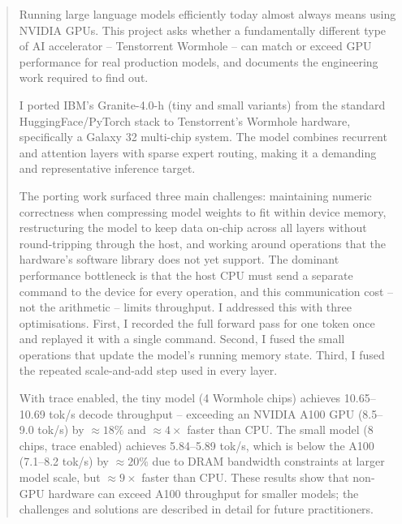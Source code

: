 \begin{abstract}
Running large language models efficiently today almost always means using NVIDIA GPUs. This project asks whether a fundamentally different type of AI accelerator -- Tenstorrent Wormhole -- can match or exceed GPU performance for real production models, and documents the engineering work required to find out.

I ported IBM's Granite-4.0-h (tiny and small variants) from the standard HuggingFace/PyTorch stack to Tenstorrent's Wormhole hardware, specifically a Galaxy 32 multi-chip system. The model combines recurrent and attention layers with sparse expert routing, making it a demanding and representative inference target.

The porting work surfaced three main challenges: maintaining numeric correctness when compressing model weights to fit within device memory, restructuring the model to keep data on-chip across all layers without round-tripping through the host, and working around operations that the hardware's software library does not yet support. The dominant performance bottleneck is that the host CPU must send a separate command to the device for every operation, and this communication cost -- not the arithmetic -- limits throughput. I addressed this with three optimisations. First, I recorded the full forward pass for one token once and replayed it with a single command. Second, I fused the small operations that update the model's running memory state. Third, I fused the repeated scale-and-add step used in every layer.

With trace enabled, the tiny model (4 Wormhole chips) achieves 10.65--10.69 tok/s decode throughput -- exceeding an NVIDIA A100 GPU (8.5--9.0 tok/s) by ${\approx}18\%$ and ${\approx}4\times$ faster than CPU. The small model (8 chips, trace enabled) achieves 5.84--5.89 tok/s, which is below the A100 (7.1--8.2 tok/s) by ${\approx}20\%$ due to DRAM bandwidth constraints at larger model scale, but ${\approx}9\times$ faster than CPU. These results show that non-GPU hardware can exceed A100 throughput for smaller models; the challenges and solutions are described in detail for future practitioners.
\end{abstract}
